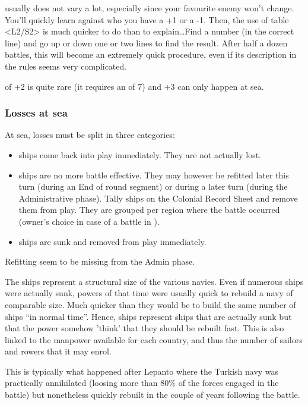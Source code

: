 \begin{designnote}
   usually does not vary a lot, especially since your
  favourite enemy won't change. You'll quickly learn against who you have a +1
  or a -1. Then, the use of table <L2/S2> is much quicker to do than to
  explain\ldots Find a number (in the correct line) and go up or down one or
  two lines to find the result. After half a dozen battles, this will become
  an extremely quick procedure, even if its description in the rules seems
  very complicated.

   of +2 is quite rare (it requires an  of 7) and +3 can only happen at sea.
\end{designnote}

\subsubsection{Losses at sea}
At sea, losses must be split in three categories:
\begin{itemize}
\item {} ships come back into play immediately. They are not
  actually lost.
\item {} ships are no more battle effective. They may however be
  refitted later this turn (during an End of round segment) or during a later
  turn (during the Administrative phase). Tally  ships on the
  Colonial Record Sheet and remove them from play. They are grouped per region
  where the battle occurred (owner's choice in case of a battle in
  \seazoneHorn).
\item {} ships are sunk and removed from play immediately.
\end{itemize}

\begin{todo}
  Refitting seem to be missing from the Admin phase.
\end{todo}

\begin{designnote}
  The  ships represent a structural size of the various
  navies. Even if numerous ships were actually sunk, powers of that time were
  usually quick to rebuild a navy of comparable size. Much quicker than they
  would be to build the same number of ships ``in normal time''. Hence,
   ships represent ships that are actually sunk but that the
  power somehow 'think' that they should be rebuilt fast. This is also linked
  to the manpower available for each country, and thus the number of sailors
  and rowers that it may enrol.

  This is typically what happened after Lepanto where the Turkish navy was
  practically annihilated (loosing more than 80\% of the forces engaged in the
  battle) but nonetheless quickly rebuilt in the couple of years following the
  battle.
\end{designnote}

